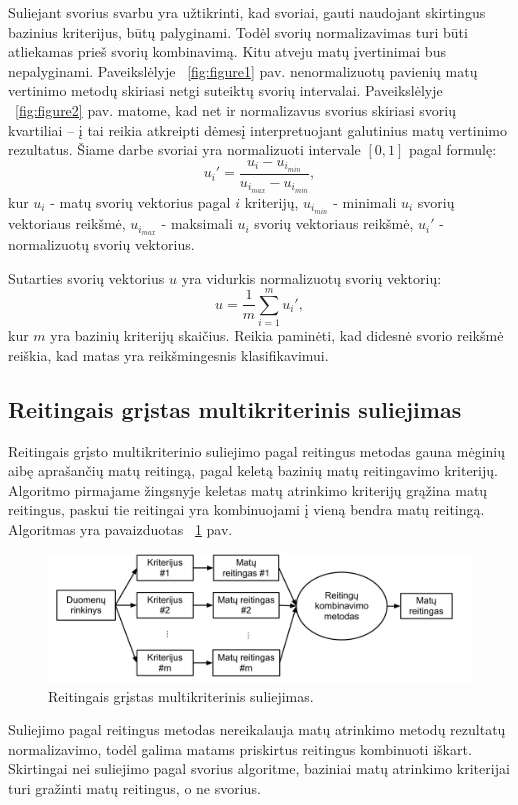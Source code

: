 Suliejant svorius svarbu yra užtikrinti, kad svoriai, gauti naudojant skirtingus bazinius kriterijus, būtų palyginami. Todėl svorių normalizavimas turi būti atliekamas prieš svorių kombinavimą. Kitu atveju matų įvertinimai bus nepalyginami. Paveikslėlyje ~\ref{fig:figure1} pav. nenormalizuotų pavienių matų vertinimo metodų skiriasi netgi suteiktų svorių intervalai. Paveikslėlyje ~\ref{fig:figure2} pav. matome, kad net ir normalizavus svorius skiriasi svorių kvartiliai -- į tai reikia atkreipti dėmesį interpretuojant galutinius matų vertinimo rezultatus. Šiame darbe svoriai yra normalizuoti intervale $[0, 1]$ pagal formulę:
\begin{equation}
 u_i'=\frac{u_i - u_{i_{min}}}{u_{i_{max}} - u_{i_{min}}}, 
\end{equation}
kur $u_i$ - matų svorių vektorius pagal $i$ kriterijų, 
$u_{i_{min}}$ - minimali $u_i$ svorių vektoriaus reikšmė,
$u_{i_{max}}$ - maksimali $u_i$ svorių vektoriaus reikšmė,
$u_i'$ - normalizuotų svorių vektorius.

Sutarties svorių vektorius $u$ yra vidurkis normalizuotų svorių vektorių:
\begin{equation}
 u = \frac{1}{m}\sum_{i=1}^m u_i',
\end{equation}
kur $m$ yra bazinių kriterijų skaičius. Reikia paminėti, kad didesnė svorio reikšmė reiškia, kad matas yra reikšmingesnis klasifikavimui.

\subsection{Reitingais grįstas multikriterinis suliejimas}

Reitingais grįsto multikriterinio suliejimo pagal reitingus metodas gauna mėginių aibę aprašančių matų reitingą, pagal keletą bazinių matų reitingavimo kriterijų. Algoritmo pirmajame žingsnyje keletas matų atrinkimo kriterijų grąžina matų reitingus, paskui tie reitingai yra kombinuojami į vieną bendra matų reitingą. Algoritmas yra
pavaizduotas ~\ref{fig:figure5} pav.
\begin{figure}
 \centering
 \includegraphics[width=1\textwidth]{images/ranking_based_fusion.pdf}
 \caption{Reitingais grįstas multikriterinis suliejimas.}
 \label{fig:figure5}
\end{figure}
Suliejimo pagal reitingus metodas nereikalauja matų atrinkimo metodų rezultatų normalizavimo, todėl galima matams priskirtus reitingus kombinuoti iškart. Skirtingai nei suliejimo pagal svorius algoritme, baziniai matų atrinkimo kriterijai turi gražinti matų reitingus, o ne svorius.

